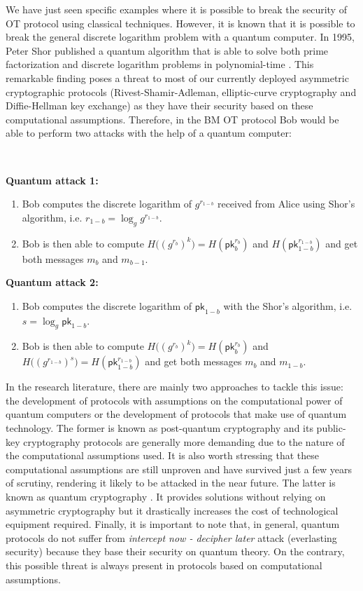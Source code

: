 We have just seen specific examples where it is possible to break the security of OT protocol using classical techniques. However, it is known that it is possible to break the general discrete logarithm problem with a quantum computer. In 1995, Peter Shor published a quantum algorithm that is able to solve both prime factorization and discrete logarithm problems in polynomial-time \cite{Sho95}. This remarkable finding poses a threat to most of our currently deployed asymmetric cryptographic protocols (Rivest-Shamir-Adleman, elliptic-curve cryptography and Diffie-Hellman key exchange) as they have their security based on these computational assumptions. Therefore, in the BM OT protocol Bob would be able to perform two attacks with the help of a quantum computer:


\

\textbf{Quantum attack 1:}
\begin{enumerate}
    \item Bob computes the discrete logarithm of $g^{r_{1-b}}$ received from Alice using Shor's algorithm, i.e. $r_{1-b} = \log_g g^{r_{1-b}}$.
    \item Bob is then able to compute $H\big((g^{r_b})^k\big) = H(\mathsf{pk}_b^{r_b})$ and $H(\mathsf{pk}_{1-b}^{r_{1-b}})$ and get both messages $m_b$ and $m_{b-1}$.
\end{enumerate}

\textbf{Quantum attack 2:}
\begin{enumerate}
    \item Bob computes the discrete logarithm of $\mathsf{pk}_{1-b}$ with the Shor's algorithm, i.e. $s = \log_g \mathsf{pk}_{1-b}$.
    \item Bob is then able to compute $H\big((g^{r_b})^k\big) = H(\mathsf{pk}_b^{r_b})$ and $H\big((g^{r_{1-b}})^s\big) = H(\mathsf{pk}_{1-b}^{r_{1-b}})$ and get both messages $m_b$ and $m_{1-b}$.
\end{enumerate}

In the research literature, there are mainly two approaches to tackle this issue: the development of protocols with assumptions on the computational power of quantum computers or the development of protocols that make use of quantum technology. The former is known as post-quantum cryptography \cite{Bernstein2017} and its public-key cryptography protocols are generally more demanding due to the nature of the computational assumptions used. It is also worth stressing that these computational assumptions are still unproven and have survived just a few years of scrutiny, rendering it likely to be attacked in the near future. The latter is known as quantum cryptography \cite{Pirandola20}. It provides solutions without relying on asymmetric cryptography but it drastically increases the cost of technological equipment required. Finally, it is important to note that, in general, quantum protocols do not suffer from \textit{intercept now - decipher later} attack (everlasting security) because they base their security on quantum theory. On the contrary, this possible threat is always present in protocols based on computational assumptions.


